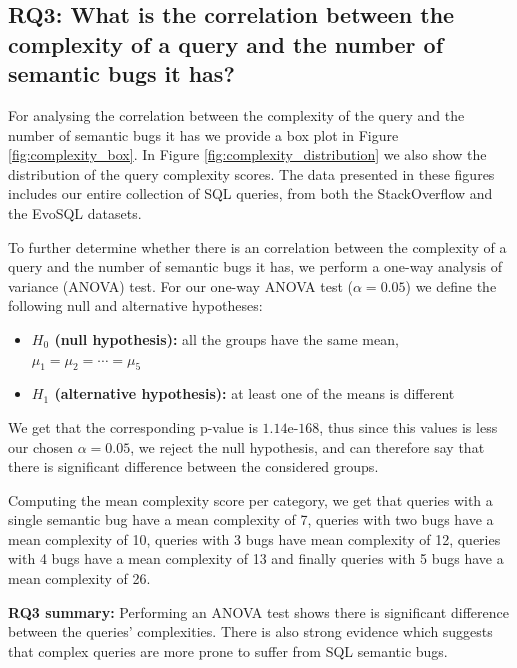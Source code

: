 \subsection{RQ3: What is the correlation between the complexity of a query and the number of semantic bugs it has?}

For analysing the correlation between the complexity of the query and the number of semantic bugs it has we provide a box plot in Figure \ref{fig:complexity_box}. In Figure \ref{fig:complexity_distribution} we also show the distribution of the query complexity scores. The data presented in these figures includes our entire collection of SQL queries, from both the StackOverflow and the EvoSQL datasets.

To further determine whether there is an correlation between the complexity of a query and the number of semantic bugs it has, we perform a one-way analysis of variance (ANOVA) test. For our one-way ANOVA test ($\alpha=0.05$) we define the following null and alternative hypotheses:

\begin{itemize}
    \item \textbf{$H_{0}$ (null hypothesis):} all the groups have the same mean, $\mu_{1} = \mu_{2} = \cdots = \mu_{5}$
    \item \textbf{$H_{1}$ (alternative hypothesis):} at least one of the means is different
\end{itemize}

We get that the corresponding p-value is $1.14$e-$168$, thus since this values is less our chosen $\alpha = 0.05$, we reject the null hypothesis, and can therefore say that there is significant difference between the considered groups. 

Computing the mean complexity score per category, we get that queries with a single semantic bug have a mean complexity of 7, queries with two bugs have a mean complexity of 10, queries with 3 bugs have mean complexity of 12, queries with 4 bugs have a mean complexity of 13 and finally queries with 5 bugs have a mean complexity of 26. 

\begin{mdframed}[default]
\noindent \textbf{RQ3 summary:} Performing an ANOVA test shows there is significant difference between the queries' complexities. There is also strong evidence which suggests that complex queries are more prone to suffer from SQL semantic bugs.
\end{mdframed}

